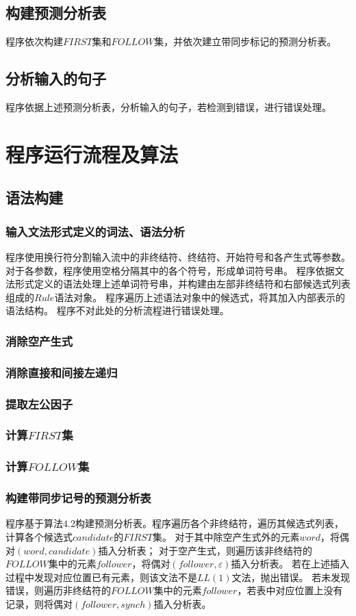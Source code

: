\documentclass[UTF8]{ctexart}
\begin{document}
\subsection{构建预测分析表}
程序依次构建$FIRST$集和$FOLLOW$集，并依次建立带同步标记的预测分析表。
\subsection{分析输入的句子}
程序依据上述预测分析表，分析输入的句子，若检测到错误，进行错误处理。
\section{程序运行流程及算法}
\subsection{语法构建}
\subsubsection{输入文法形式定义的词法、语法分析}
程序使用换行符分割输入流中的非终结符、终结符、开始符号和各产生式等参数。对于各参数，程序使用空格分隔其中的各个符号，形成单词符号串。
程序依据文法形式定义的语法处理上述单词符号串，并构建由左部非终结符和右部候选式列表组成的$Rule$语法对象。
程序遍历上述语法对象中的候选式，将其加入内部表示的语法结构。
程序不对此处的分析流程进行错误处理。
\subsubsection{消除空产生式}
\subsubsection{消除直接和间接左递归}
\subsubsection{提取左公因子}
\subsubsection{计算$FIRST$集}
\subsubsection{计算$FOLLOW$集}
\subsubsection{构建带同步记号的预测分析表}
程序基于算法$4.2$构建预测分析表。程序遍历各个非终结符，遍历其候选式列表，计算各个候选式$candidate$的$FIRST$集。
对于其中除空产生式外的元素$word$，将偶对$(word, candidate)$插入分析表；
对于空产生式，则遍历该非终结符的$FOLLOW$集中的元素$follower$，将偶对$(follower, \varepsilon)$插入分析表。
若在上述插入过程中发现对应位置已有元素，则该文法不是$LL(1)$文法，抛出错误。
若未发现错误，则遍历非终结符的$FOLLOW$集中的元素$follower$，若表中对应位置上没有记录，则将偶对$(follower, synch)$插入分析表。
\end{document}

